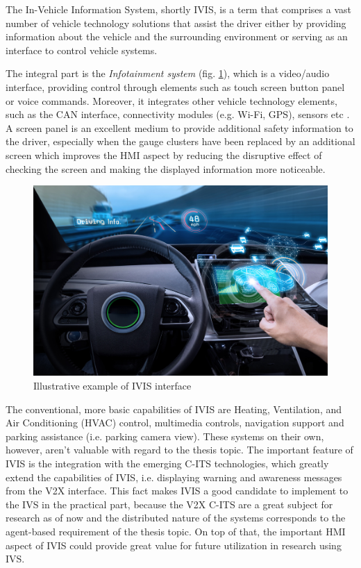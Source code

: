 \documentclass[main.tex]{subfiles}
\begin{document}
The In-Vehicle Information System, shortly IVIS, is a term that comprises a vast number of vehicle technology 
solutions that assist the driver either by providing information about the vehicle and the surrounding environment 
or serving as an interface to control vehicle systems. 

The integral part is the \emph{Infotainment system} (fig. \ref{ivis-interface}), which is a
video/audio interface, providing control through elements such as touch screen button panel or
voice commands.  Moreover, it integrates other vehicle technology elements, such as the CAN
interface, connectivity modules (e.g. Wi-Fi, GPS), sensors etc \cite{Saxena}. A screen panel is
an excellent medium to provide additional safety information to the driver, especially when the
gauge clusters have been replaced by an additional screen which improves the HMI aspect by
reducing the disruptive effect of checking the screen and making the displayed information more
noticeable. 

\begin{figure}[htbp]
    \centering
    \includegraphics[width=.8\textwidth]{ivis-dashboard.jpg}
    \caption{Illustrative example of IVIS interface \cite{Saxena}}
    \label{ivis-interface}
\end{figure}

The conventional, more basic capabilities of IVIS are Heating, Ventilation, and Air
Conditioning (HVAC) control, multimedia controls, navigation support and parking assistance
(i.e. parking camera view). These systems on their own, however, aren't valuable with regard to
the thesis topic. The important feature of IVIS is the integration with the emerging C-ITS
technologies, which greatly extend the capabilities of IVIS, i.e. displaying warning and
awareness messages from the V2X interface.  This fact makes IVIS a good candidate to implement
to the IVS in the practical part, because the V2X C-ITS are a great subject for research as of
now and the distributed nature of the systems corresponds to the agent-based requirement of the
thesis topic. On top of that, the important HMI aspect of IVIS could provide great value for
future utilization in research using IVS. 
\end{document}

